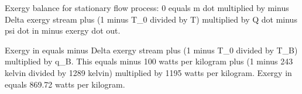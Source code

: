 Exergy balance for stationary flow process:  
0 equals m dot multiplied by minus Delta exergy stream plus (1 minus T_0 divided by T) multiplied by Q dot minus psi dot in minus exergy dot out.  

Exergy in equals minus Delta exergy stream plus (1 minus T_0 divided by T_B) multiplied by q_B.  
This equals minus 100 watts per kilogram plus (1 minus 243 kelvin divided by 1289 kelvin) multiplied by 1195 watts per kilogram.  
Exergy in equals 869.72 watts per kilogram.